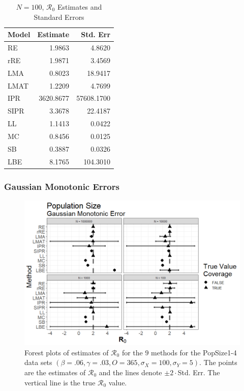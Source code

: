 \documentclass[12pt]{article}
\newcommand{\xxsir}{\ensuremath{9} } %
\newcommand{\rr}{\ensuremath{\mathcal{R}_0}}
\begin{document}
\begin{table}[H]
	
	\centering
	\begin{tabular}[t]{l|r|r}
		\hline
		Model & Estimate & Std. Err\\
		\hline
		RE & 1.9863 & 4.8620\\
		\hline
		rRE & 1.9871 & 3.4569\\
		\hline
		LMA & 0.8023 & 18.9417\\
		\hline
		LMAT & 1.2209 & 4.7699\\
		\hline
		IPR & 3620.8677 & 57608.1700\\
		\hline
		SIPR & 3.3678 & 22.4187\\
		\hline
		LL & 1.1413 & 0.0422\\
		\hline
		MC & 0.8456 & 0.0125\\
		\hline
		SB & 0.3887 & 0.0326\\
		\hline
		LBE & 8.1765 & 104.3010\\
		\hline
	\end{tabular}
\caption{$N = 100$, $\rr$ Estimates and Standard Errors}\label{tab:n2-res2}
\end{table}

\subsubsection{Gaussian Monotonic Errors}

\begin{figure}[H]
	\centering
	\includegraphics[scale=0.5]{images/popsize_nm.tiff}
	\caption{Forest plots of estimates of $\rr$ for the \xxsir methods for the PopSize1-4 data sets $(\beta=.06, \gamma=.03, O=365, \sigma_X=100, \sigma_Y=5)$.  The points are the estimates of $\rr$ and the lines denote $\pm 2\cdot $Std. Err.  The vertical line is the true $\rr$ value.}
\end{figure}
\end{document}
